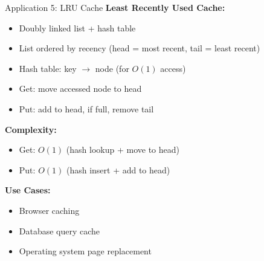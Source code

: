 \documentclass[aspectratio=169,xcolor=dvipsnames]{beamer}
\begin{document}
\begin{frame}{Application 5: LRU Cache}
  \textbf{Least Recently Used Cache:}
  \begin{itemize}
    \item Doubly linked list + hash table
    \item List ordered by recency (head = most recent, tail = least recent)
    \item Hash table: key $\to$ node (for $O(1)$ access)
    \item Get: move accessed node to head
    \item Put: add to head, if full, remove tail
  \end{itemize}

  \vspace{0.3cm}
  \textbf{Complexity:}
  \begin{itemize}
    \item Get: $O(1)$ (hash lookup + move to head)
    \item Put: $O(1)$ (hash insert + add to head)
  \end{itemize}

  \vspace{0.3cm}
  \textbf{Use Cases:}
  \begin{itemize}
    \item Browser caching
    \item Database query cache
    \item Operating system page replacement
  \end{itemize}
\end{frame}
\end{document}
